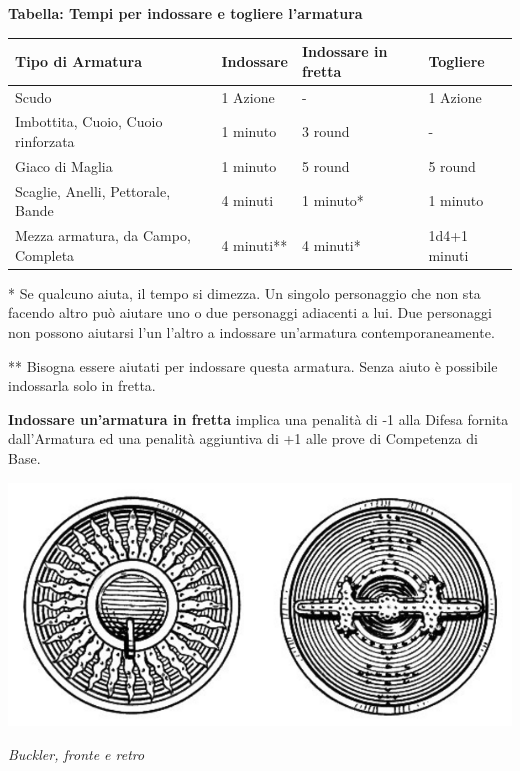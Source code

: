 \textbf{Tabella: Tempi per indossare e togliere l'armatura}

\medskip

\noindent\begin{tabular}{llll}
\textbf{Tipo di Armatura}& \textbf{Indossare} & \textbf{Indossare in fretta} & \textbf{Togliere}\\
\toprule
Scudo& 1 Azione & - & 1 Azione\\
Imbottita, Cuoio, Cuoio rinforzata& 1 minuto& 3 round& - \\
Giaco di Maglia& 1 minuto& 5 round& 5 round\\
Scaglie, Anelli, Pettorale, Bande & 4 minuti & 1 minuto{*}& 1 minuto\\
Mezza armatura, da Campo, Completa& 4 minuti{*}{*}& 4 minuti{*}& 1d4+1 minuti
\end{tabular}

\bigskip

\begin{multicols}{2}

{*} Se qualcuno aiuta, il tempo si dimezza. Un singolo personaggio che non sta facendo altro può aiutare uno o due personaggi adiacenti a lui. Due personaggi non possono aiutarsi l'un l'altro a indossare un'armatura contemporaneamente.

{*}{*} Bisogna essere aiutati per indossare questa armatura. Senza aiuto è possibile indossarla solo in fretta.

\textbf{Indossare un'armatura in fretta} implica una penalità di -1 alla Difesa fornita dall'Armatura ed una penalità aggiuntiva di +1 alle prove di Competenza di Base.

\end{multicols}


\begin{center}
	\includegraphics[width=0.4\linewidth]{immagini/buckler.png}

	\emph{Buckler, fronte e retro}
\end{center}

\pagebreak


